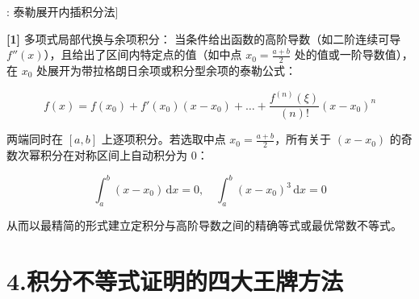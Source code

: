 \documentclass[11pt,a4paper,UTF8]{ctexart}
\begin{document}
\begin{thmbox}[方法[6]: 泰勒展开内插积分法]

\textbf{[1]} 多项式局部代换与余项积分：
当条件给出函数的高阶导数（如二阶连续可导 $f''(x)$），且给出了区间内特定点的值（如中点 $x_0 = \frac{a+b}{2}$ 处的值或一阶导数值），在 $x_0$ 处展开为带拉格朗日余项或积分型余项的泰勒公式：


\begin{equation*}
f(x) = f(x_0) + f'(x_0)(x-x_0) + \dots + \frac{f^{(n)}(\xi)}{(n)!}(x-x_0)^n
\end{equation*}


两端同时在 $[a, b]$ 上逐项积分。若选取中点 $x_0 = \frac{a+b}{2}$，所有关于 $(x-x_0)$ 的奇数次幂积分在对称区间上自动积分为 0：


\begin{equation*}
\int_a^b (x-x_0)\,\mathrm{d}x = 0, \quad \int_a^b (x-x_0)^3\,\mathrm{d}x = 0
\end{equation*}


从而以最精简的形式建立定积分与高阶导数之间的精确等式或最优常数不等式。

\end{thmbox}

\section{4.积分不等式证明的四大王牌方法}
\end{document}

